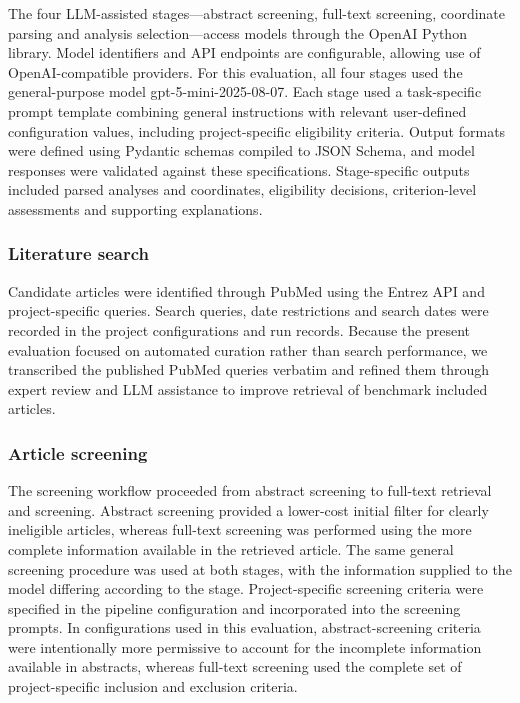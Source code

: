 The four LLM-assisted stages---abstract screening, full-text screening, coordinate parsing and analysis selection---access models through the OpenAI Python library. Model identifiers and API endpoints are configurable, allowing use of OpenAI-compatible providers. For this evaluation, all four stages used the general-purpose model gpt-5-mini-2025-08-07. Each stage used a task-specific prompt template combining general instructions with relevant user-defined configuration values, including project-specific eligibility criteria. Output formats were defined using Pydantic schemas compiled to JSON Schema, and model responses were validated against these specifications. Stage-specific outputs included parsed analyses and coordinates, eligibility decisions, criterion-level assessments and supporting explanations.

\subsubsection{Literature search}

Candidate articles were identified through PubMed using the Entrez API and project-specific queries. Search queries, date restrictions and search dates were recorded in the project configurations and run records. Because the present evaluation focused on automated curation rather than search performance, we transcribed the published PubMed queries verbatim and refined them through expert review and LLM assistance to improve retrieval of benchmark included articles.

\subsubsection{Article screening}

The screening workflow proceeded from abstract screening to full-text retrieval and screening. Abstract screening provided a lower-cost initial filter for clearly ineligible articles, whereas full-text screening was performed using the more complete information available in the retrieved article. The same general screening procedure was used at both stages, with the information supplied to the model differing according to the stage. Project-specific screening criteria were specified in the pipeline configuration and incorporated into the screening prompts. In configurations used in this evaluation, abstract-screening criteria were intentionally more permissive to account for the incomplete information available in abstracts, whereas full-text screening used the complete set of project-specific inclusion and exclusion criteria.

